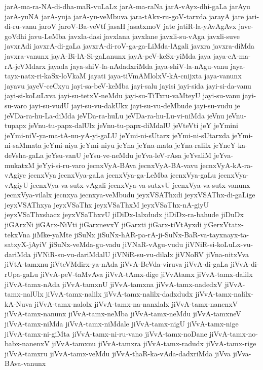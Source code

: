 {jarA-ma-ra-NA-di-dha-maR-vuLaLx
jarA-ma-raNa
jarA-vAyx-dhi-gaLa
jarAyu
jarA-yuNA
jarA-yuja
jarA-yu-veMbuva
jara-tAkx-ru-goV-tarxda
jarayA
jare
jari-di-ru-vanu
jaroV
jaroV-Ba-veVtf
jasaH
jasatxmoV
jate
jatiR-la-yAvAgAvx
jave-goVdhi
javu-LeMba
javxla-dasi
javxlana
javxlane
javxli-su-vAga
javxli-suve
javxrAdi
javxrA-di-gaLa
javxrA-di-roV-ga-ga-LiMda-lAgali
javxra
javxra-diMda
javxra-vanunx
jayA-Bi-lA-Si-gaLanunx
jayA-peV-keSx-yiMda
jaya
jaya-cA-ma-rA-jeVMdarx
jayada
jaya-shiV-la-nAdadxriMda
jaya-shiV-la-nAgu-vanu
jaya-tayx-natx-ri-kaSx-loVkaM
jayati
jaya-tiVmAMlolxV-kA-cnijxta
jaya-vanunx
jayavu
jayeV-ceCxyu
jayi-sa-beV-keMba
jayi-salu
jayisi
jayi-sida
jayi-si-da-vanu
jayi-si-koLuLxva
jayi-su-tetxV-neMdu
jayi-su-TiTxru-vaMteyU
jayi-su-vanu
jayi-su-varo
jayi-su-vudU
jayi-su-vu-dakUkx
jayi-su-vu-deMbude
jayi-su-vudu
je
jeVDa-ra-hu-La-diMda
jeVDa-ra-huLu
jeVDa-ra-hu-Lu-vi-niMda
jeVnu
jeVnu-tupapx
jeVnu-tu-papx-dalUlx
jeVnu-tu-papx-diMdalU
jeVteVti
jeY
jeYmini
jeYmi-niV-ya-ma-tA-nu-yA-yi-gaLU
jeYmi-ni-sUtarx
jeYmi-ni-sUtarxda
jeYmi-ni-saMmata
jeYmi-niya
jeYmi-niyu
jeYna
jeYna-mata
jeYna-ralilx
jeYneY-ka-deVsha-gaLa
jeYsu-vanU
jeYsu-ve-neMdu
jeYva-leV-rAsa
jeYvaliM
jeYva-mukatxM
jeYyi-si-ru-varo
jecnxVyA-BAva
jecnxVyA-BA-vavu
jecnxVyA-kA-ra-vAgiye
jecnxVya
jecnxVya-gaLa
jecnxVya-ga-LeMba
jecnxVya-gaLu
jecnxVya-vAgiyU
jecnxVya-va-sutx-vAgali
jecnxVya-va-sutxvU
jecnxVya-va-sutx-vanunx
jecnxVya-vilalx
jecnxya
jecnxya-veMbudu
jeyxVSAThxdi
jeyxVSAThx-di-gaLige
jeyxVSAThxya
jeyxVSaThx
jeyxVSaThxM
jeyxVSaThx-nA-giyU
jeyxVSaThxshacx
jeyxVSaThxvU
jiDiDx-lalxdudx
jiDiDx-ra-bahude
jiDuDx
jiGArxNi
jiGArx-NiVti
jiGarxnevxY
jiGarxti
jiGarx-tiVtAyxdi
jiGerxVtatx-tekxVna
jiMke-yaMte
jiSuNx
jiSuNx-hAR-pa-rA-ji-SuNx-BaR-va-tayxnayx-ta-satxyX-jAyiV
jiSuNx-veMda-gu-vadu
jiVNaR-vAgu-vudu
jiVNiR-si-koLuLx-vu-dariMda
jiVNiR-su-vu-dariMdalU
jiVNiR-su-vu-dilalx
jiVNoRV
jiVna-nitxVva
jiVtA-tamxnu
jiVteVMdirx-ya-nAda
jiVvA-BeVda-viruva
jiVvA-di-gaLa
jiVvA-di-rUpa-gaLu
jiVvA-peV-taMvAva
jiVvA-tAmx-dige
jiVvAtamx
jiVvA-tamx-dalilx
jiVvA-tamx-nAda
jiVvA-tamxnU
jiVvA-tamxna
jiVvA-tamx-nadedxV
jiVvA-tamx-nalUlx
jiVvA-tamx-nalilx
jiVvA-tamx-nalilx-dadxdudx
jiVvA-tamx-nalilx-kA-Nuva
jiVvA-tamx-nalolx
jiVvA-tamx-na-nanxlalx
jiVvA-tamx-nanenxV
jiVvA-tamx-nanunx
jiVvA-tamx-neMba
jiVvA-tamx-neMdu
jiVvA-tamxneV
jiVvA-tamx-niMda
jiVvA-tamx-niMdale
jiVvA-tamx-nigU
jiVvA-tamx-nige
jiVvA-tamx-ni-giMta
jiVvA-tamx-ni-ru-vano
jiVvA-tamx-noDane
jiVvA-tamx-no-babx-nanenxV
jiVvA-tamxnu
jiVvA-tamxra
jiVvA-tamx-radudx
jiVvA-tamx-rige
jiVvA-tamxru
jiVvA-tamx-veMdu
jiVvA-thaR-ka-vAda-dadxriMda
jiVva
jiVva-BAva-vanunx
}
